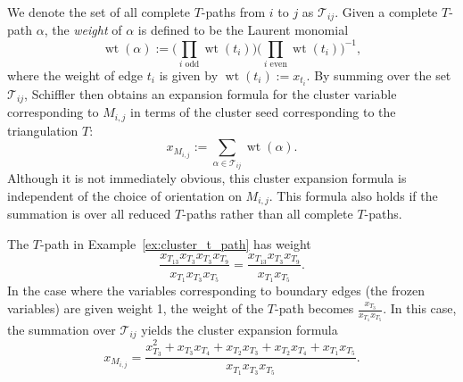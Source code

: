 \documentclass[pdftex]{sigma}
\numberwithin{equation}{section}
\DeclareMathOperator{\wt}{wt}
\begin{document}
\begin{Example}
\begin{center}
\end{center}
\end{Example}
We denote the set of all complete $T$-paths from $i$ to $j$ as $\mathcal{T}_{ij}$. Given a complete $T$-path $\alpha$, the \emph{weight} of $\alpha$ is defined to be the Laurent monomial
\[ \wt(\alpha) := \bigg( \prod_{i \textrm{ odd}} \wt(t_{i}) \bigg)\bigg( \prod_{i \textrm{ even}} \wt(t_i) \bigg)^{-1}, \]
where the weight of edge $t_i$ is given by $\wt(t_i) := x_{t_i}$. By summing over the set $\mathcal{T}_{ij}$, Schiffler \cite{S-10} then obtains an expansion formula for the cluster variable corresponding to $M_{i,j}$ in terms of the cluster seed corresponding to the triangulation $T$:
\[ x_{M_{i,j}} := \sum_{\alpha \in \mathcal{T}_{ij}} \wt(\alpha). \]
Although it is not immediately obvious, this cluster expansion formula is independent of the choice of orientation on $M_{i,j}$. This formula also holds if the summation is over all reduced $T$-paths rather than all complete $T$-paths.
\begin{Example}
The $T$-path in Example~\ref{ex:cluster_t_path} has weight \[\frac{x_{T_{13}}x_{T_3}x_{T_3}x_{T_9}}{x_{T_1}x_{T_3}x_{T_5}}=\frac{x_{T_{13}}x_{T_3}x_{T_9}}{x_{T_1}x_{T_5}}.\] In the case where the variables corresponding to boundary edges (the frozen variables) are given weight 1, the weight of the $T$-path becomes $\frac{x_{T_3}}{x_{T_1}x_{T_5}}.$ In this case, the summation over $\mathcal{T}_{ij}$ yields the cluster expansion formula
\[ x_{M_{i,j}} = \frac{x_{T_3}^2 + x_{T_3}x_{T_4} + x_{T_2}x_{T_3} + x_{T_2}x_{T_4} + x_{T_1}x_{T_5}}{x_{T_1}x_{T_3}x_{T_5}}.\]
\end{Example}
\end{document}
